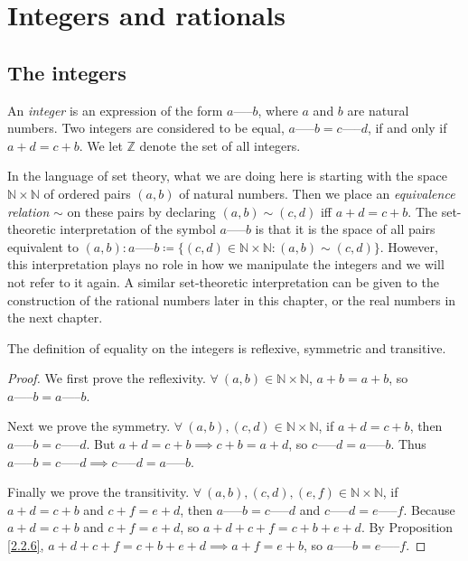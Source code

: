 \chapter{Integers and rationals}
\section{The integers}

\begin{definition}[Integers]\label{4.1.1}
An \emph{integer} is an expression of the form \(a \text{-----} b\), where \(a\) and \(b\) are natural numbers.
Two integers are considered to be equal, \(a \text{-----} b = c \text{-----} d\), if and only if \(a + d = c + b\).
We let \(\mathds{Z}\) denote the set of all integers.
\end{definition}

In the language of set theory, what we are doing here is starting with the space \(\mathds{N} \times \mathds{N}\) of ordered pairs \((a, b)\) of natural numbers.
Then we place an \emph{equivalence relation} \(\sim\) on these pairs by declaring \((a, b) \sim (c, d)\) iff \(a + d = c + b\).
The set-theoretic interpretation of the symbol \(a \text{-----} b\) is that it is the space of all pairs equivalent to \((a, b): a \text{-----} b \coloneqq \{(c, d) \in \mathds{N} \times \mathds{N} : (a, b) \sim (c, d)\}\).
However, this interpretation plays no role in how we manipulate the integers and we will not refer to it again.
A similar set-theoretic interpretation can be given to the construction of the rational numbers later in this chapter, or the real numbers in the next chapter.

\begin{additional corollary}\label{ac 4.1.1}
The definition of equality on the integers is reflexive, symmetric and transitive.
\end{additional corollary}

\begin{proof}
We first prove the reflexivity.
\(\forall\ (a, b) \in \mathds{N} \times \mathds{N}\), \(a + b = a + b\), so \(a \text{-----} b = a \text{-----} b\).

Next we prove the symmetry.
\(\forall\ (a, b), (c, d) \in \mathds{N} \times \mathds{N}\), if \(a + d = c + b\), then \(a \text{-----} b = c \text{-----} d\).
But \(a + d = c + b \implies c + b = a + d\), so \(c \text{-----} d = a \text{-----} b\).
Thus \(a \text{-----} b = c \text{-----} d \implies c \text{-----} d = a \text{-----} b\).

Finally we prove the transitivity.
\(\forall\ (a, b), (c, d), (e, f) \in \mathds{N} \times \mathds{N}\), if \(a + d = c + b\) and \(c + f = e + d\), then \(a \text{-----} b = c \text{-----} d\) and \(c \text{-----} d = e \text{-----} f\).
Because \(a + d = c + b\) and \(c + f = e + d\), so \(a + d + c + f = c + b + e + d\).
By Proposition \ref{2.2.6}, \(a + d + c + f = c + b + e + d \implies a + f = e + b\), so \(a \text{-----} b = e \text{-----} f\).
\end{proof}


